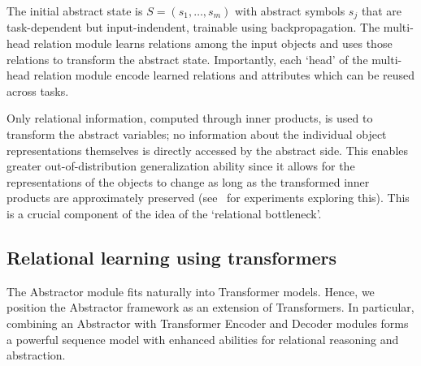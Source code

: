 
The initial abstract state is $S = (s_1,\ldots, s_m)$
with abstract symbols $s_j$ that are task-dependent but input-indendent, trainable using
backpropagation. The multi-head relation module learns relations among the input objects and uses those
relations to transform the abstract state. Importantly, each `head' of the multi-head relation module
encode learned relations and attributes which can be reused across tasks.

Only relational information, computed through inner products,
is used to transform the abstract variables; no information about the individual object representations themselves is directly accessed by the abstract side. This enables greater out-of-distribution generalization ability since it allows for the representations of the objects to change as long as the transformed inner products are approximately preserved (see~ for experiments exploring this). This is a crucial component of the idea of the `relational bottleneck'.



\subsection{Relational learning using transformers}

The Abstractor module fits naturally into Transformer models. Hence, we position the Abstractor framework as an extension of Transformers. In particular, combining an Abstractor with Transformer Encoder and Decoder modules forms a powerful sequence model with enhanced abilities for relational reasoning and abstraction.

